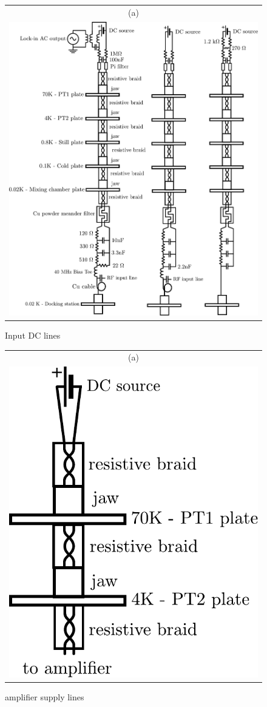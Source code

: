 \begin{figure}[hptb]
	\begin{center}
		\begin{tabular}{c}
			(a) \\ 
			
			 \includegraphics[height = 12 cm]{./appB/input_DC_line}
		\end{tabular}
	\end{center}
	
	\caption{Input DC lines}
	\label{fig: Input DC lines}
\end{figure}

\begin{figure}[hptb]
	\begin{center}
		\begin{tabular}{c}
			(a) \\ 
			
			\includegraphics[height = 4 cm]{./appB/power_supply_ampli}
		\end{tabular}
	\end{center}
	
	\caption{amplifier supply lines}
	\label{fig: amplifier supply lines}
\end{figure}


